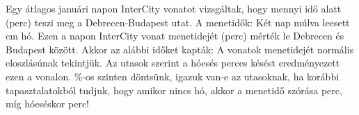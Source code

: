 Egy átlagos januári napon  InterCity vonatot vizsgáltak, 
hogy mennyi idő alatt (perc) teszi meg a Debrecen-Budapest utat. A menetidők:
Két nap múlva leesett  cm hó. Ezen a napon  
InterCity vonat menetidejét (perc) mérték le Debrecen és Budapest között. 
Akkor az alábbi időket kapták:
A vonatok menetidejét normális eloszlásúnak tekintjük. Az utasok szerint a
hóesés  perces késést eredményezett ezen a vonalon.
\%-os szinten döntsünk, igazuk van-e az utasoknak, 
ha korábbi tapasztalatokból tudjuk, hogy amikor nincs hó, akkor a 
menetidő szórása  perc, míg
hóeséskor  perc!

